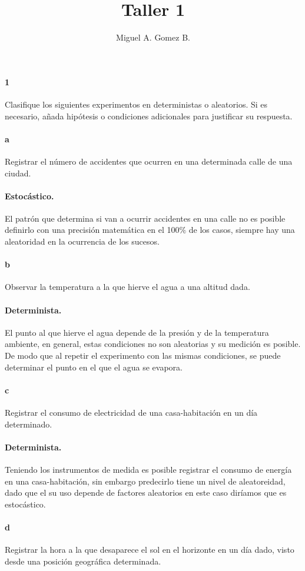 \documentclass{article}
\title{Taller 1}
\author{Miguel A. Gomez B.}
\begin{document}
	\maketitle
\paragraph{1} Clasifique los siguientes experimentos en deterministas o aleatorios. Si es necesario, añada hipótesis o condiciones adicionales para justificar su respuesta.
\paragraph{a} Registrar el número de accidentes que ocurren en una determinada calle de una ciudad.
\paragraph{Estocástico.} El patrón que determina si van a ocurrir accidentes en una calle no es posible definirlo con una precisión matemática en el 100$\%$ de los casos, siempre hay una aleatoridad en la ocurrencia de los sucesos.
\paragraph{b} Observar la temperatura a la que hierve el agua a una altitud dada.
\paragraph{Determinista.} El punto al que hierve el agua depende de la presión y de la temperatura ambiente, en general, estas condiciones no son aleatorias y su medición es posible. De modo que al repetir el experimento con las mismas condiciones, se puede determinar el punto en el que el agua se evapora.
\paragraph{c} Registrar el consumo de electricidad de una casa-habitación en un día determinado.
\paragraph{Determinista.} Teniendo los instrumentos de medida es posible registrar el consumo de energía en una casa-habitación, sin embargo predecirlo tiene un nivel de aleatoreidad, dado que el su uso depende de factores aleatorios en este caso diríamos que es estocástico.
\paragraph{d}Registrar la hora a la que desaparece el sol en el horizonte en un día dado, visto desde una posición geográfica determinada.
\end{document}
